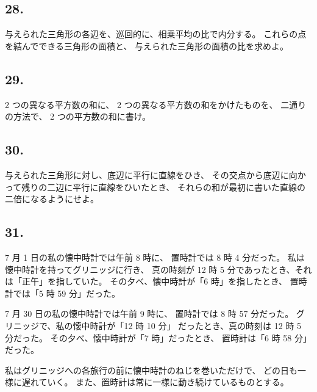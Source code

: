\subsection*{28.}

与えられた三角形の各辺を、巡回的に、相乗平均の比で内分する。
これらの点を結んでできる三角形の面積と、
与えられた三角形の面積の比を求めよ。

\begin{flushright}
[12/78]
\end{flushright}

\subsection*{29.}

 2 つの異なる平方数の和に、 2 つの異なる平方数の和をかけたものを、
二通りの方法で、 2 つの平方数の和に書け。

\begin{flushright}
[3/12/81]
\end{flushright}

\subsection*{30.}

与えられた三角形に対し、底辺に平行に直線をひき、
その交点から底辺に向かって残りの二辺に平行に直線をひいたとき、
それらの和が最初に書いた直線の二倍になるようにせよ。

\begin{flushright}
[15/3/89]
\end{flushright}

\subsection*{31.}

7 月 1 日の私の懐中時計では午前 8 時に、
置時計では 8 時 4 分だった。
私は懐中時計を持ってグリニッジに行き、
真の時刻が 12 時 5 分であったとき、それは「正午」を指していた。
その夕べ、懐中時計が「6 時」を指したとき、
置時計では「5 時 59 分」だった。

7 月 30 日の私の懐中時計では午前 9 時に、
置時計では 8 時 57 分だった。
グリニッジで、私の懐中時計が「12 時 10 分」
だったとき、真の時刻は 12 時 5 分だった。
その夕べ、懐中時計が「7 時」だったとき、
置時計は「6 時 58 分」だった。

私はグリニッジへの各旅行の前に懐中時計のねじを巻いただけで、
どの日も一様に遅れていく。
また、置時計は常に一様に動き続けているものとする。


